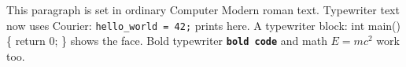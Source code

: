 \documentclass{article}
\begin{document}
This paragraph is set in ordinary Computer Modern roman text.
Typewriter text now uses Courier: \texttt{hello\_world = 42;} prints here.
A typewriter block: {\ttfamily int main() \{ return 0; \}} shows the face.
Bold typewriter \texttt{\textbf{bold code}} and math $E = mc^2$ work too.
\end{document}
